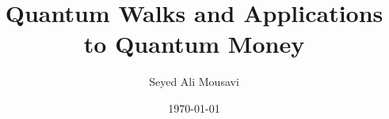 \documentclass{beamer}
\title{Quantum Walks and Applications to Quantum Money}
\author{Seyed Ali Mousavi}
\institute{Supervised by Dr. Jake Doliskani}
\date{\today}
\theoremstyle{definition}
\begin{document}
\begin{frame}
    \titlepage
\end{frame}






   
    

    









    
    





    
\end{document}
